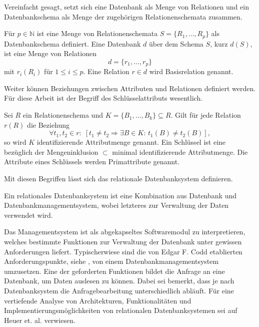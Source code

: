 Vereinfacht gesagt, setzt sich eine Datenbank als Menge von Relationen und ein Datenbankschema als Menge der zugehörigen Relationenschemata zusammen.

\begin{defi}
    Für $p \in \mathbb{N}$ ist eine Menge von Relationenschemata $S=\{R_1, \ldots, R_p\}$ als Datenbankschema definiert. Eine Datenbank $d$ über dem Schema $S$, kurz $d(S)$, ist eine Menge von Relationen
    \begin{equation*}
        d=\{r_1, \ldots, r_p \}
    \end{equation*}
    mit $r_i(R_i)$ für $1 \leq i \leq p$. Eine Relation $r \in d$ wird Basisrelation genannt.
\end{defi}

Weiter können Beziehungen zwischen Attributen und Relationen definiert werden. Für diese Arbeit ist der Begriff des Schlüsselattributs wesentlich.

\begin{defi}[Schlüssel]
    \label{def:key}
    Sei $R$ ein Relationenschema und $K=\{B_1, \ldots, B_k\} \subseteq R$. Gilt für jede Relation $r(R)$ die Beziehung
    \begin{equation*}
         \forall t_1, t_2 \in r: \; [ t_1 \neq t_2 \Rightarrow \exists B \in K: \, t_1(B) \neq t_2(B)],
    \end{equation*}
    so wird $K$ identifizierende Attributmenge genannt. Ein Schlüssel ist eine bezüglich der Mengeninklusion $\subset$ minimal identifizierende Attributmenge. Die Attribute eines Schlüssels werden Primattribute genannt.
\end{defi}

Mit diesen Begriffen lässt sich das relationale Datenbanksystem definieren.

\begin{defi}
    Ein relationales Datenbanksystem ist eine Kombination aus Datenbank und Datenbankmanagementsystem, wobei letzteres zur Verwaltung der Daten verwendet wird.
\end{defi}

Das Managementsystem ist als abgekapseltes Softwaremodul zu interpretieren, welches bestimmte Funktionen zur Verwaltung der Datenbank unter gewissen Anforderungen liefert. Typischerwiese sind die von Edgar F. Codd etablierten Anforderungspunkte, siehe \cite{DBLP:books/daglib/0044627}, von einem Datenbankmanagementsystem umzusetzen. Eine der geforderten Funktionen bildet die Anfrage an eine Datenbank, um Daten auslesen zu können. Dabei sei bemerkt, dass je nach Datenbanksystem die Anfragebearbeitung unterschiedlich abläuft. Für eine vertiefende Analyse von Architekturen, Funktionalitäten und Implementierungsmöglichkeiten von relationalen Datenbanksystemen sei auf Heuer et. al.\cite{DBLP:books/mitp/HSS19, DBLP:books/daglib/0044627} verwiesen. 

